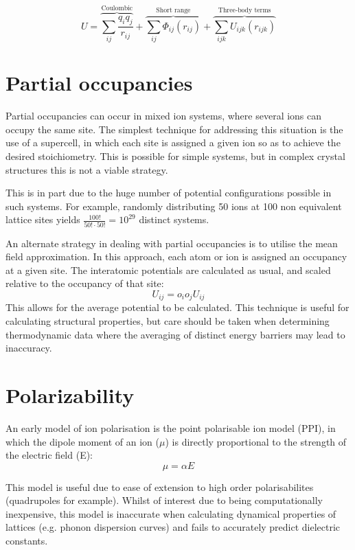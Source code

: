 \begin{equation}
U = \overbrace{\sum_{ij} \frac{q_iq_j}{r_{ij}}}^\text{Coulombic} + \overbrace{\sum_{ij} \Phi_{ij}(r_{ij})}^\text{Short range} + \overbrace{\sum_{ijk} U_{ijk}(r_{ijk})}^\text{Three-body terms}
\end{equation}

\section{Partial occupancies}
Partial occupancies can occur in mixed ion systems, where several ions can occupy the same site.
The simplest technique for addressing this situation is the use of a supercell, in which each site is assigned a given ion so as to achieve the desired stoichiometry.
This is possible for simple systems, but in complex crystal structures this is not a viable strategy.

This is in part due to the huge number of potential configurations possible in such systems.
For example, randomly distributing 50 ions at 100 non equivalent lattice sites yields $\frac{100!}{50!\cdot50!} = 10^{29}$ distinct systems.

An alternate strategy in dealing with partial occupancies is to utilise the mean field approximation.
In this approach, each atom or ion is assigned an occupancy at a given site.
The interatomic potentials are calculated as usual, and scaled relative to the occupancy of that site:
$$
U_{ij} = o_io_jU_{ij}
$$
This allows for the average potential to be calculated.
This technique is useful for calculating structural properties, but care should be taken when determining thermodynamic data where the averaging of distinct energy barriers may lead to inaccuracy.

\section{Polarizability}

An early model of ion polarisation is the point polarisable ion model (PPI), in which the dipole moment of an ion ($\mu$) is directly proportional to the strength of the electric field (E):
\begin{equation}
\mu = \alpha E
\end{equation}

This model is useful due to ease of extension to high order polarisabilites (quadrupoles for example).
Whilst of interest due to being computationally inexpensive, this model is inaccurate when calculating dynamical properties of lattices (e.g. phonon dispersion curves) and fails to accurately predict dielectric constants.

